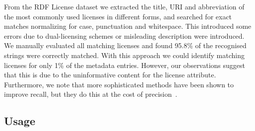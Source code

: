 \documentclass[11pt]{article}
\begin{document}
From the RDF License dataset \cite{rdflicense} we extracted the  title, URI and abbreviation of the most
commonly used licenses in different forms, and searched for exact matches
normalizing for case, punctuation and whitespace. This introduced some errors due to
dual-licensing schemes or misleading description were introduced.
We manually evaluated all matching licenses and found 95.8\% of the
recognised strings were correctly matched. %
With this approach we could identify matching licenses for only 1\% of the metadata entries. However, 
our observations suggest that this is due to the uninformative content for the license attribute. Furthermore, we note that more sophisticated
methods have been shown to improve recall, but they do this at the cost of
precision~\cite{cabrio2014these}.


\subsection{Usage}
\end{document}
